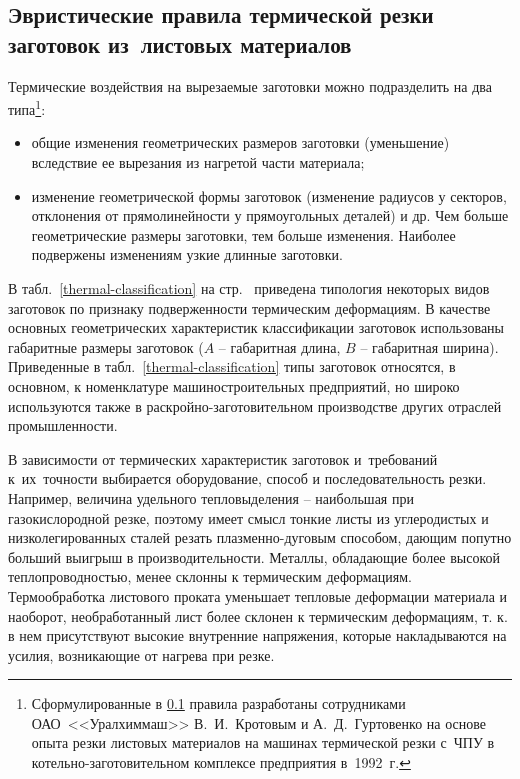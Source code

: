 
\subsection{
  Эвристические правила термической резки заготовок
  из~листовых материалов
}
\label{sect:133}

Термические воздействия на вырезаемые заготовки можно подразделить на два типа\footnote{
  Сформулированные в \ref{sect:133}
  правила разработаны сотрудниками ОАО~<<Уралхиммаш>>
  В.~И.~Кротовым и А.~Д.~Гуртовенко на основе опыта
  резки листовых материалов на машинах термической резки с~ЧПУ
  в котельно-заготовительном комплексе предприятия в~1992~г.
}:

\begin{itemize}
\item
общие изменения геометрических размеров заготовки (уменьшение)
вследствие ее вырезания из нагретой части материала;
\item
изменение геометрической формы заготовок
(изменение радиусов у секторов,
отклонения от прямолинейности у прямоугольных деталей) и др.
Чем больше геометрические размеры заготовки,
тем больше изменения.
Наиболее  подвержены изменениям узкие длинные заготовки.
\end{itemize}

В табл.~\ref{thermal-classification}
на стр.~\pageref{thermal-classification}
приведена типология некоторых видов заготовок
по признаку подверженности термическим деформациям.
В качестве основных геометрических характеристик
классификации заготовок использованы габаритные размеры заготовок
($A$ -- габаритная длина,
$B$ -- габаритная ширина).
Приведенные в табл.~\ref{thermal-classification}
типы заготовок относятся,
в основном, к номенклатуре машиностроительных предприятий,
но широко используются также в раскройно-заготовительном производстве
других отраслей промышленности.

В зависимости от термических характеристик заготовок
и~требований к~их~точности выбирается оборудование,
способ и последовательность резки.
Например, величина удельного тепловыделения --
наибольшая при газокислородной резке,
поэтому имеет смысл тонкие листы из углеродистых и
низколегированных сталей резать плазменно-дуговым способом,
дающим попутно больший выигрыш в производительности.
Металлы, обладающие более высокой теплопроводностью,
менее склонны к термическим деформациям.
Термообработка листового проката уменьшает
тепловые деформации материала и наоборот,
необработанный лист более склонен к термическим деформациям,
т. к. в нем присутствуют высокие внутренние  напряжения,
которые накладываются на усилия, возникающие от  нагрева при резке.

